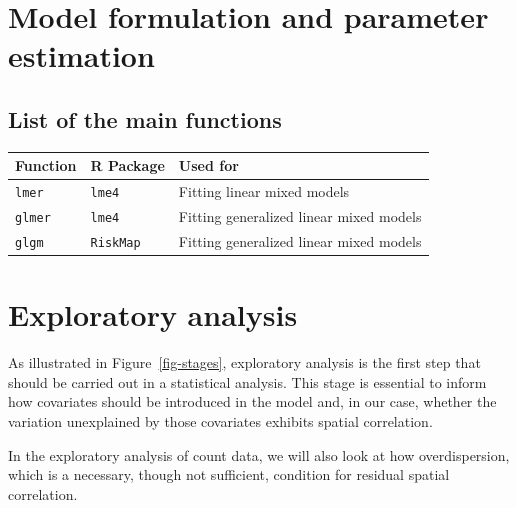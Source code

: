 \documentclass[
  letterpaper,
]{krantz}
\begin{document}
\hypertarget{section}{%
\section{}\label{section}}


\hypertarget{model-formulation-and-parameter-estimation}{%
\chapter{Model formulation and parameter
estimation}\label{model-formulation-and-parameter-estimation}}

\hypertarget{list-of-the-main-functions}{%
\section*{List of the main functions}\label{list-of-the-main-functions}}


\begin{longtable}[]{@{}lll@{}}
\toprule\noalign{}
Function & R Package & Used for \\
\midrule\noalign{}
\endhead
\bottomrule\noalign{}
\endlastfoot
\texttt{lmer} & \texttt{lme4} & Fitting linear mixed models \\
\texttt{glmer} & \texttt{lme4} & Fitting generalized linear mixed
models \\
\texttt{glgm} & \texttt{RiskMap} & Fitting generalized linear mixed
models \\
\end{longtable}


\hypertarget{exploratory-analysis}{%
\chapter{Exploratory analysis}\label{exploratory-analysis}}

As illustrated in Figure~\ref{fig-stages}, exploratory analysis is the
first step that should be carried out in a statistical analysis. This
stage is essential to inform how covariates should be introduced in the
model and, in our case, whether the variation unexplained by those
covariates exhibits spatial correlation.

In the exploratory analysis of count data, we will also look at how
overdispersion, which is a necessary, though not sufficient, condition
for residual spatial correlation.
\end{document}
